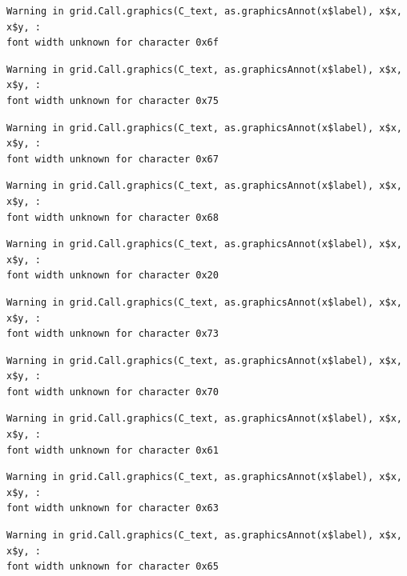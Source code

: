 \documentclass[
  letterpaper,
  DIV=11,
  numbers=noendperiod]{scrreprt}
\begin{document}
\begin{verbatim}
Warning in grid.Call.graphics(C_text, as.graphicsAnnot(x$label), x$x, x$y, :
font width unknown for character 0x6f
\end{verbatim}

\begin{verbatim}
Warning in grid.Call.graphics(C_text, as.graphicsAnnot(x$label), x$x, x$y, :
font width unknown for character 0x75
\end{verbatim}

\begin{verbatim}
Warning in grid.Call.graphics(C_text, as.graphicsAnnot(x$label), x$x, x$y, :
font width unknown for character 0x67
\end{verbatim}

\begin{verbatim}
Warning in grid.Call.graphics(C_text, as.graphicsAnnot(x$label), x$x, x$y, :
font width unknown for character 0x68
\end{verbatim}

\begin{verbatim}
Warning in grid.Call.graphics(C_text, as.graphicsAnnot(x$label), x$x, x$y, :
font width unknown for character 0x20
\end{verbatim}

\begin{verbatim}
Warning in grid.Call.graphics(C_text, as.graphicsAnnot(x$label), x$x, x$y, :
font width unknown for character 0x73
\end{verbatim}

\begin{verbatim}
Warning in grid.Call.graphics(C_text, as.graphicsAnnot(x$label), x$x, x$y, :
font width unknown for character 0x70
\end{verbatim}

\begin{verbatim}
Warning in grid.Call.graphics(C_text, as.graphicsAnnot(x$label), x$x, x$y, :
font width unknown for character 0x61
\end{verbatim}

\begin{verbatim}
Warning in grid.Call.graphics(C_text, as.graphicsAnnot(x$label), x$x, x$y, :
font width unknown for character 0x63
\end{verbatim}

\begin{verbatim}
Warning in grid.Call.graphics(C_text, as.graphicsAnnot(x$label), x$x, x$y, :
font width unknown for character 0x65
\end{verbatim}
\end{document}

